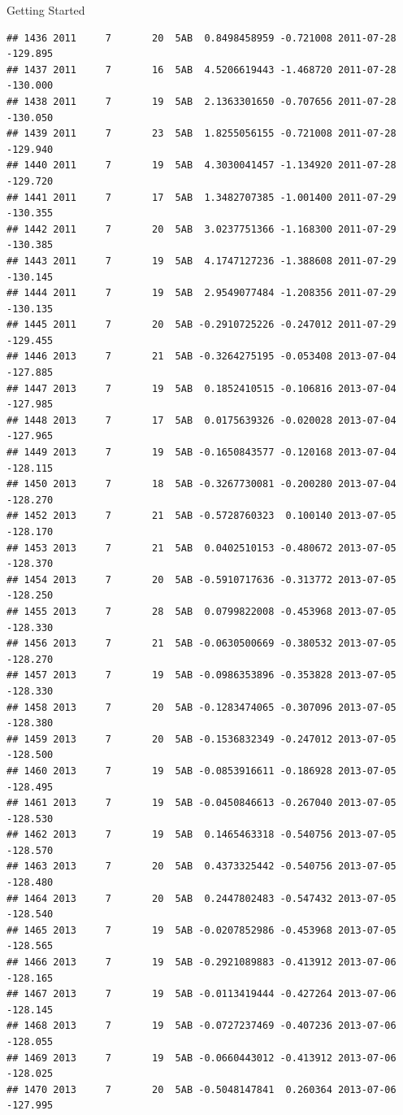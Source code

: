 \documentclass[
  ignorenonframetext,
]{beamer}
\begin{document}
\begin{frame}[fragile]{Getting Started}
\begin{verbatim}
## 1436 2011     7       20  5AB  0.8498458959 -0.721008 2011-07-28 -129.895
## 1437 2011     7       16  5AB  4.5206619443 -1.468720 2011-07-28 -130.000
## 1438 2011     7       19  5AB  2.1363301650 -0.707656 2011-07-28 -130.050
## 1439 2011     7       23  5AB  1.8255056155 -0.721008 2011-07-28 -129.940
## 1440 2011     7       19  5AB  4.3030041457 -1.134920 2011-07-28 -129.720
## 1441 2011     7       17  5AB  1.3482707385 -1.001400 2011-07-29 -130.355
## 1442 2011     7       20  5AB  3.0237751366 -1.168300 2011-07-29 -130.385
## 1443 2011     7       19  5AB  4.1747127236 -1.388608 2011-07-29 -130.145
## 1444 2011     7       19  5AB  2.9549077484 -1.208356 2011-07-29 -130.135
## 1445 2011     7       20  5AB -0.2910725226 -0.247012 2011-07-29 -129.455
## 1446 2013     7       21  5AB -0.3264275195 -0.053408 2013-07-04 -127.885
## 1447 2013     7       19  5AB  0.1852410515 -0.106816 2013-07-04 -127.985
## 1448 2013     7       17  5AB  0.0175639326 -0.020028 2013-07-04 -127.965
## 1449 2013     7       19  5AB -0.1650843577 -0.120168 2013-07-04 -128.115
## 1450 2013     7       18  5AB -0.3267730081 -0.200280 2013-07-04 -128.270
## 1452 2013     7       21  5AB -0.5728760323  0.100140 2013-07-05 -128.170
## 1453 2013     7       21  5AB  0.0402510153 -0.480672 2013-07-05 -128.370
## 1454 2013     7       20  5AB -0.5910717636 -0.313772 2013-07-05 -128.250
## 1455 2013     7       28  5AB  0.0799822008 -0.453968 2013-07-05 -128.330
## 1456 2013     7       21  5AB -0.0630500669 -0.380532 2013-07-05 -128.270
## 1457 2013     7       19  5AB -0.0986353896 -0.353828 2013-07-05 -128.330
## 1458 2013     7       20  5AB -0.1283474065 -0.307096 2013-07-05 -128.380
## 1459 2013     7       20  5AB -0.1536832349 -0.247012 2013-07-05 -128.500
## 1460 2013     7       19  5AB -0.0853916611 -0.186928 2013-07-05 -128.495
## 1461 2013     7       19  5AB -0.0450846613 -0.267040 2013-07-05 -128.530
## 1462 2013     7       19  5AB  0.1465463318 -0.540756 2013-07-05 -128.570
## 1463 2013     7       20  5AB  0.4373325442 -0.540756 2013-07-05 -128.480
## 1464 2013     7       20  5AB  0.2447802483 -0.547432 2013-07-05 -128.540
## 1465 2013     7       19  5AB -0.0207852986 -0.453968 2013-07-05 -128.565
## 1466 2013     7       19  5AB -0.2921089883 -0.413912 2013-07-06 -128.165
## 1467 2013     7       19  5AB -0.0113419444 -0.427264 2013-07-06 -128.145
## 1468 2013     7       19  5AB -0.0727237469 -0.407236 2013-07-06 -128.055
## 1469 2013     7       19  5AB -0.0660443012 -0.413912 2013-07-06 -128.025
## 1470 2013     7       20  5AB -0.5048147841  0.260364 2013-07-06 -127.995

\end{verbatim}
\end{frame}
\end{document}
